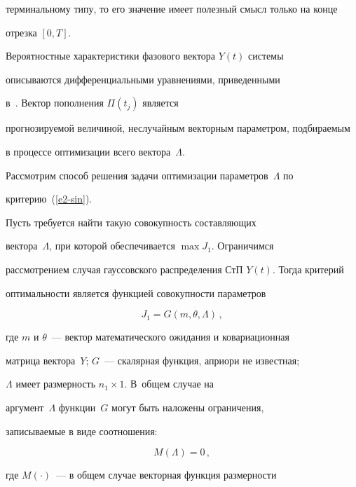 терминальному типу, то его значение имеет полезный смысл только на конце

отрезка $[0, T]$.



     Вероятностные характеристики фазового вектора $Y(t)$ сис\-те\-мы

описываются дифференциальными уравнениями, приведенными

     в~\cite{1-sin, 12-sin}. Вектор пополнения $\Pi (t_j)$ является

прогнозируемой величиной, неслучайным векторным параметром, подбираемым

в процессе оптимизации всего вектора~$\Lambda$.



     Рассмотрим способ решения задачи оптимизации параметров~$\Lambda$ по

критерию~(\ref{e2-sin}).



     Пусть требуется найти такую совокупность составляющих

вектора~$\Lambda$, при которой обеспечивается $\max J_1$. Ограничимся

рассмотрением случая гауссовского распределения СтП $Y(t)$. Тогда критерий

оптимальности является функцией совокупности параметров

     \begin{equation*}

     J_1=G(m,\theta, \Lambda)\,,


     \end{equation*}

где $m$ и $\theta$~--- вектор математического ожидания и ковариационная

матрица вектора~$Y$; $G$~--- скалярная функция, априори не известная;

$\Lambda$ имеет размерность $n_1\times 1$. В~общем случае на

аргумент~$\Lambda$ функции~$G$ могут быть наложены ограничения,

записываемые в виде соотношения:

\begin{equation}

{M}(\Lambda) =0\,,

\label{e8-sin}

\end{equation}

где ${M}(\cdot)$~--- в общем случае векторная функция размерности

